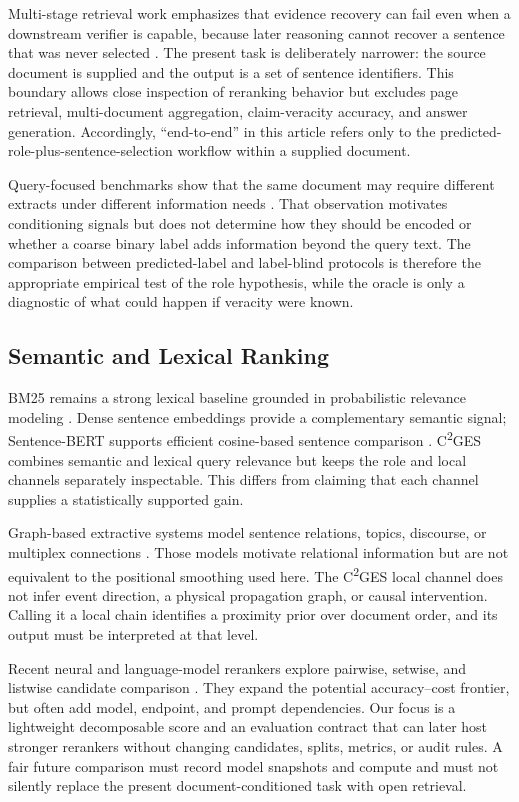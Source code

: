 \documentclass[applsci,article,submit,moreauthors]{Definitions/mdpi}
\newcommand{\cges}{C\textsuperscript{2}GES}
\begin{document}
Multi-stage retrieval work emphasizes that evidence recovery can fail even when a downstream verifier is capable, because later reasoning cannot recover a sentence that was never selected \cite{liao2023muser,liang2020hammer}. The present task is deliberately narrower: the source document is supplied and the output is a set of sentence identifiers. This boundary allows close inspection of reranking behavior but excludes page retrieval, multi-document aggregation, claim-veracity accuracy, and answer generation. Accordingly, ``end-to-end'' in this article refers only to the predicted-role-plus-sentence-selection workflow within a supplied document.

Query-focused benchmarks show that the same document may require different extracts under different information needs \cite{zhong2021qmsum,vig2022exploring}. That observation motivates conditioning signals but does not determine how they should be encoded or whether a coarse binary label adds information beyond the query text. The comparison between predicted-label and label-blind protocols is therefore the appropriate empirical test of the role hypothesis, while the oracle is only a diagnostic of what could happen if veracity were known.

\subsection{Semantic and Lexical Ranking}
BM25 remains a strong lexical baseline grounded in probabilistic relevance modeling \cite{robertson2009probabilistic}. Dense sentence embeddings provide a complementary semantic signal; Sentence-BERT supports efficient cosine-based sentence comparison \cite{reimers2019sentencebert}. \cges{} combines semantic and lexical query relevance but keeps the role and local channels separately inspectable. This differs from claiming that each channel supplies a statistically supported gain.

Graph-based extractive systems model sentence relations, topics, discourse, or multiplex connections \cite{wang2020heterogeneous,cui2020enhancing,jing2021multiplex}. Those models motivate relational information but are not equivalent to the positional smoothing used here. The \cges{} local channel does not infer event direction, a physical propagation graph, or causal intervention. Calling it a local chain identifies a proximity prior over document order, and its output must be interpreted at that level.

Recent neural and language-model rerankers explore pairwise, setwise, and listwise candidate comparison \cite{qin2024pairwise,zhuang2024setwise,ren2025selfcalibrated}. They expand the potential accuracy--cost frontier, but often add model, endpoint, and prompt dependencies. Our focus is a lightweight decomposable score and an evaluation contract that can later host stronger rerankers without changing candidates, splits, metrics, or audit rules. A fair future comparison must record model snapshots and compute and must not silently replace the present document-conditioned task with open retrieval.
\end{document}
